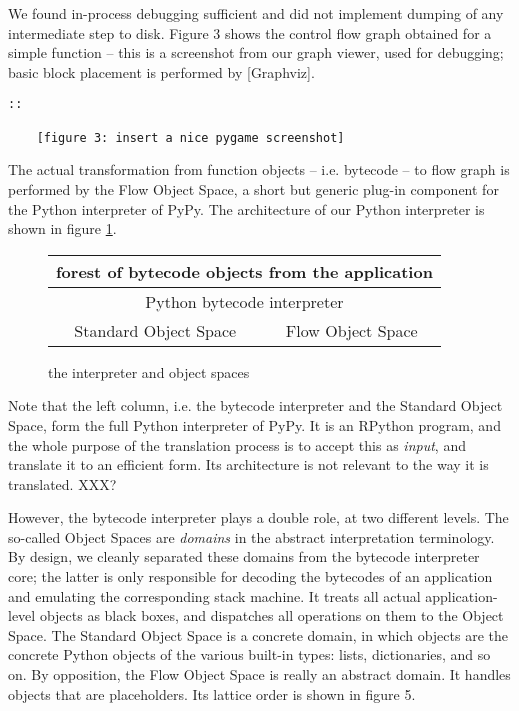 \documentclass{acm_proc_article-sp}
\begin{document}
We found in-process debugging sufficient and did not implement dumping
of any intermediate step to disk.  Figure 3 shows the control flow graph
obtained for a simple function -- this is a screenshot from our graph
viewer, used for debugging; basic block placement is performed by
[Graphviz].

\begin{verbatim}
::

    [figure 3: insert a nice pygame screenshot]
\end{verbatim}
    
The actual transformation from function objects -- i.e. bytecode -- to
flow graph is performed by the Flow Object Space, a short but generic
plug-in component for the Python interpreter of PyPy.  The architecture
of our Python interpreter is shown in figure \ref{interpobjspace}.

\begin{figure}
  \centering
  \caption{the interpreter and object spaces}
  \label{interpobjspace}
  \begin{tabular}{|c|c|} \hline
\multicolumn{2}{|c|}{forest of bytecode objects from the application}    \\ \hline
\multicolumn{2}{|c|}{Python bytecode interpreter}            \\ \hline
    Standard Object Space     &  Flow Object Space  \\ \hline
  \end{tabular}
\end{figure}

Note that the left column, i.e. the bytecode interpreter and the
Standard Object Space, form the full Python interpreter of PyPy.  It is
an RPython program, and the whole purpose of the translation process is
to accept this as \textit{input}, and translate it to an efficient form.  Its
architecture is not relevant to the way it is translated. XXX?

However, the bytecode interpreter plays a double role, at two different
levels.  The so-called Object Spaces are \textit{domains} in the abstract
interpretation terminology.  By design, we cleanly separated these
domains from the bytecode interpreter core; the latter is only
responsible for decoding the bytecodes of an application and emulating
the corresponding stack machine.  It treats all actual application-level
objects as black boxes, and dispatches all operations on them to the
Object Space.  The Standard Object Space is a concrete domain, in which
objects are the concrete Python objects of the various built-in types:
lists, dictionaries, and so on.  By opposition, the Flow Object Space is
really an abstract domain.  It handles objects that are placeholders.
Its lattice order is shown in figure 5.
\end{document}
